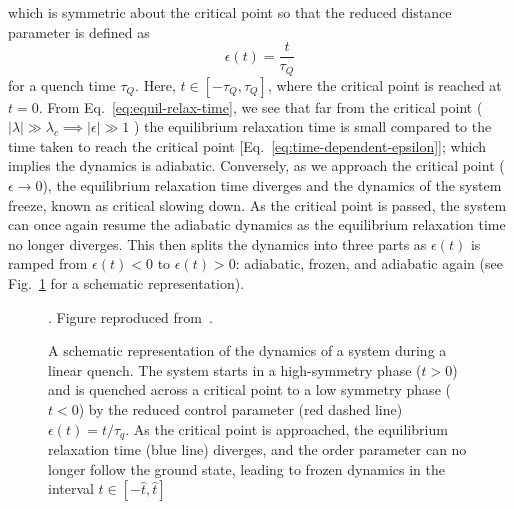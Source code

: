 which is symmetric about the critical point so that the reduced distance
parameter is defined as
\begin{equation}
    \epsilon(t) = \frac{t}{\tau_Q}
    \label{eq:time-dependent-epsilon}
\end{equation}
for a quench time $\tau_Q$.
Here, $t \in [-\tau_Q, \tau_Q]$, where the critical point is reached at $t=0$.
From Eq.~\eqref{eq:equil-relax-time}, we see that far from the critical point
($|\lambda| \gg \lambda_c \implies |\epsilon| \gg 1$ ) the equilibrium
relaxation time is small compared to the time taken to reach the critical point
[Eq.~\eqref{eq:time-dependent-epsilon}]; which implies the dynamics is
adiabatic.
Conversely, as we approach the critical point ($\epsilon \rightarrow 0$), the
equilibrium relaxation time diverges and the dynamics of the system freeze,
known as critical slowing down.
As the critical point is passed, the system can once again resume the adiabatic
dynamics as the equilibrium relaxation time no longer diverges.
This then splits the dynamics into three parts as $\epsilon(t)$ is ramped from
$\epsilon(t) < 0 $ to $\epsilon(t) > 0$: adiabatic, frozen, and adiabatic again
(see Fig.~\ref{fig:adiabatic-impulse} for a schematic representation).
\begin{figure}
    \centering
    \caption{A schematic representation of the dynamics of a system during a
    linear quench. The system starts in a high-symmetry phase ($t>0$) and is
    quenched across a critical point to a low symmetry phase ($t < 0$) by the
    reduced control parameter (red dashed line) $\epsilon(t)=t/\tau_q$. As
    the critical point is approached, the equilibrium relaxation time
    (blue line) diverges, and the order parameter can no longer follow the 
    ground state, leading to frozen dynamics in the interval
    $t \in [-\hat{t}, \hat{t}]$}. Figure reproduced from~\cite{delCampo2013}.
    \label{fig:adiabatic-impulse}
\end{figure}

